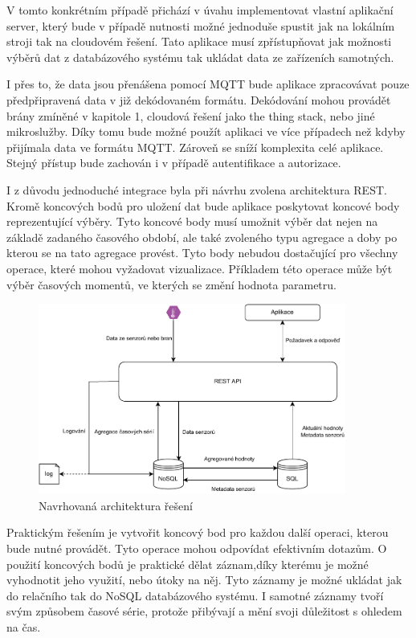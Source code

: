 V tomto konkrétním případě přichází v úvahu implementovat vlastní aplikační server, který bude v případě nutnosti možné jednoduše spustit jak na lokálním stroji tak na cloudovém řešení. Tato aplikace musí zpřístupňovat jak možnosti výběrů dat z databázového systému tak ukládat data ze zařízeních samotných.

I přes to, že data jsou přenášena pomocí MQTT bude aplikace zpracovávat pouze předpřipravená data v již dekódovaném formátu. Dekódování mohou provádět brány zmíněné v kapitole 1, cloudová řešení jako the thing stack, nebo jiné mikroslužby. Díky tomu bude možné použít aplikaci ve více případech než kdyby přijímala data ve formátu MQTT. Zároveň se sníží komplexita celé aplikace. Stejný přístup bude zachován i v případě autentifikace a autorizace.

I z důvodu jednoduché integrace byla při návrhu zvolena architektura REST. Kromě koncových bodů pro uložení dat bude aplikace poskytovat koncové body reprezentující výběry. Tyto koncové body musí umožnit výběr dat nejen na základě zadaného časového období, ale také zvoleného typu agregace a doby po kterou se na tato agregace provést. Tyto body nebudou dostačující pro všechny operace, které mohou vyžadovat vizualizace. Příkladem této operace může být výběr časových momentů, ve kterých se změní hodnota parametru.

\begin{figure}[H]
\label{question4}
\begin{center}
    \includegraphics[width=0.9\textwidth]{obrazky-figures/layerArchitecture.pdf}
\end{center}
\caption{Navrhovaná architektura řešení}
\end{figure}

Praktickým řešením je vytvořit koncový bod pro každou další operaci, kterou bude nutné provádět. Tyto operace mohou odpovídat efektivním dotazům. O použití koncových bodů je praktické dělat záznam,díky kterému je možné vyhodnotit jeho využití, nebo útoky na něj. Tyto záznamy je možné ukládat jak do relačního tak do NoSQL databázového systému. I samotné záznamy tvoří svým způsobem časové série, protože přibývají a mění svoji důležitost s ohledem na čas.


